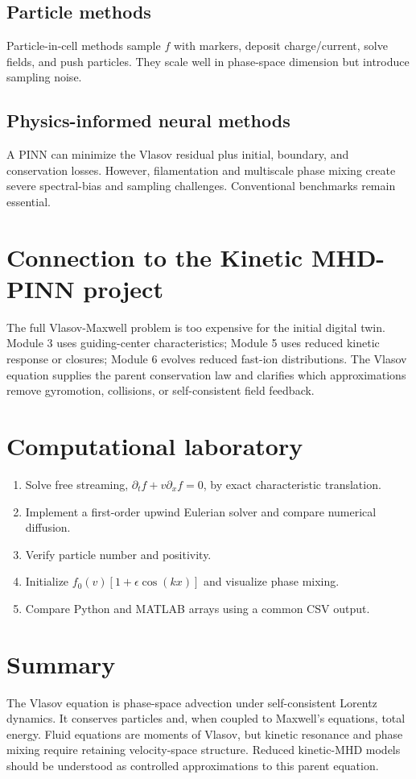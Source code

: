 \documentclass[11pt]{article}
\begin{document}
\subsection{Particle methods}
Particle-in-cell methods sample $f$ with markers, deposit charge/current, solve fields, and push particles. They scale well in phase-space dimension but introduce sampling noise.

\subsection{Physics-informed neural methods}
A PINN can minimize the Vlasov residual plus initial, boundary, and conservation losses. However, filamentation and multiscale phase mixing create severe spectral-bias and sampling challenges. Conventional benchmarks remain essential.

\section{Connection to the Kinetic MHD-PINN project}
The full Vlasov-Maxwell problem is too expensive for the initial digital twin. Module 3 uses guiding-center characteristics; Module 5 uses reduced kinetic response or closures; Module 6 evolves reduced fast-ion distributions. The Vlasov equation supplies the parent conservation law and clarifies which approximations remove gyromotion, collisions, or self-consistent field feedback.

\section{Computational laboratory}
\begin{enumerate}[leftmargin=1.6em]
\item Solve free streaming, $\partial_t f+v\partial_x f=0$, by exact characteristic translation.
\item Implement a first-order upwind Eulerian solver and compare numerical diffusion.
\item Verify particle number and positivity.
\item Initialize $f_0(v)[1+\epsilon\cos(kx)]$ and visualize phase mixing.
\item Compare Python and MATLAB arrays using a common CSV output.
\end{enumerate}

\section{Summary}
The Vlasov equation is phase-space advection under self-consistent Lorentz dynamics. It conserves particles and, when coupled to Maxwell's equations, total energy. Fluid equations are moments of Vlasov, but kinetic resonance and phase mixing require retaining velocity-space structure. Reduced kinetic-MHD models should be understood as controlled approximations to this parent equation.
\end{document}
